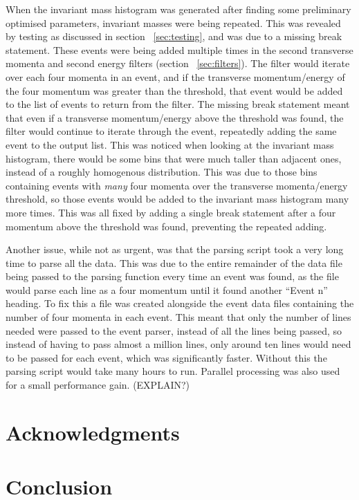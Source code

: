 \documentclass[11pt]{amsart}
\begin{document}
\begin{multicols}{2}
When the invariant mass histogram was generated after finding some preliminary optimised parameters, invariant masses were being repeated. This was revealed by testing as discussed in section ~\ref{sec:testing}, and was due to a missing break statement. These events were being added multiple times in the second transverse momenta and second energy filters (section ~\ref{sec:filters}). The filter would iterate over each four momenta in an event, and if the transverse momentum/energy of the four momentum was greater than the threshold, that event would be added to the list of events to return from the filter. The missing break statement meant that even if a transverse momentum/energy above the threshold was found, the filter would continue to iterate through the event, repeatedly adding the same event to the output list. This was noticed when looking at the invariant mass histogram, there would be some bins that were much taller than adjacent ones, instead of a roughly homogenous distribution. This was due to those bins containing events with \textit{many} four momenta over the transverse momenta/energy threshold, so those events would be added to the invariant mass histogram many more times. This was all fixed by adding a single break statement after a four momentum above the threshold was found, preventing the repeated adding.

Another issue, while not as urgent, was that the parsing script took a very long time to parse all the data. This was due to the entire remainder of the data file being passed to the parsing function every time an event was found, as the file would parse each line as a four momentum until it found another ``Event n'' heading. To fix this a file was created alongside the event data files containing the number of four momenta in each event. This meant that only the number of lines needed were passed to the event parser, instead of all the lines being passed, so instead of having to pass almost a million lines, only around ten lines would need to be passed for each event, which was significantly faster. Without this the parsing script would take many hours to run. Parallel processing was also used for a small performance gain. (EXPLAIN?)

\section{Acknowledgments}

\section{Conclusion}



\end{multicols}



\end{document}
